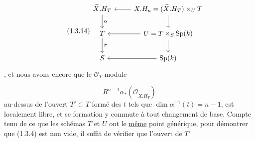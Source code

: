 \begin{equation}\tag{1.3.14}
\begin{tikzcd}
\widetilde{X}.H_T \arrow[d, "\alpha"] & X.H_u = (\widetilde{X}.H_T) \times_U T \arrow[l] \arrow[d] \\
T \arrow[d, "\pi"] & U = T \times_S \mathrm{Sp}(k) \arrow[l] \arrow[d] \\
S & \mathrm{Sp}(k) \arrow[l]
\end{tikzcd}
\end{equation}
, et nous avons encore que le $\mathcal{O}_T$-module

\begin{equation}\tag{1.3.15}
R^{n-1}\alpha_*(\mathcal{O}_{\widetilde{X}.H_T})
\end{equation}
au-dessus de l'ouvert $T' \subset T$ formé des $t$ tels que $\dim \alpha^{-1}(t) = n-1$, est localement libre, et se formation y commute à tout changement de base. Compte tenu de ce que les schémas $T$ et $U$ ont le \underline{même} point générique, pour démontrer que (1.3.4) est non vide, il suffit de vérifier que l'ouvert de $T'$

